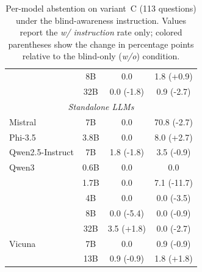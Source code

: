 \begin{table}[t]
{\begin{tabular}{lc|cc}
 & 8B & 0.0 & 1.8 \textcolor{[HTML]{0072B2}}{(+0.9)} \\
 & 32B & 0.0 \textcolor{[HTML]{CC7A00}}{(-1.8)} & 0.9 \textcolor{[HTML]{CC7A00}}{(-2.7)} \\
\midrule
\multicolumn{4}{c}{\textit{Standalone LLMs}} \\
\midrule
Mistral & 7B & 0.0 & 70.8 \textcolor{[HTML]{CC7A00}}{(-2.7)} \\
Phi-3.5 & 3.8B & 0.0 & 8.0 \textcolor{[HTML]{0072B2}}{(+2.7)} \\
Qwen2.5-Instruct & 7B & 1.8 \textcolor{[HTML]{CC7A00}}{(-1.8)} & 3.5 \textcolor{[HTML]{CC7A00}}{(-0.9)} \\
Qwen3 & 0.6B & 0.0 & 0.0 \\
 & 1.7B & 0.0 & 7.1 \textcolor{[HTML]{CC7A00}}{(-11.7)} \\
 & 4B & 0.0 & 0.0 \textcolor{[HTML]{CC7A00}}{(-3.5)} \\
 & 8B & 0.0 \textcolor{[HTML]{CC7A00}}{(-5.4)} & 0.0 \textcolor{[HTML]{CC7A00}}{(-0.9)} \\
 & 32B & 3.5 \textcolor{[HTML]{0072B2}}{(+1.8)} & 0.0 \textcolor{[HTML]{CC7A00}}{(-2.7)} \\
Vicuna & 7B & 0.0 & 0.9 \textcolor{[HTML]{CC7A00}}{(-0.9)} \\
 & 13B & 0.9 \textcolor{[HTML]{CC7A00}}{(-0.9)} & 1.8 \textcolor{[HTML]{0072B2}}{(+1.8)} \\
\bottomrule
\end{tabular}
}
\caption{\small Per-model abstention on variant~C (113 questions) under the blind-awareness instruction. Values report the \textit{w/ instruction} rate only; colored parentheses show the change in percentage points relative to the blind-only (\textit{w/o}) condition.}
\label{tab:abstention_inst_effect_vC_q113}
\end{table}
